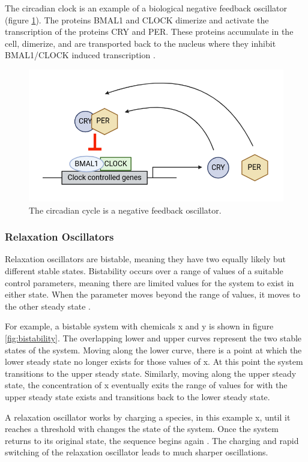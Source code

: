 \documentclass[12pt]{report}
\begin{document}
The circadian clock is an example of a biological negative feedback oscillator (figure \ref{fig:circadian}). The proteins BMAL1 and CLOCK dimerize and activate the transcription of the proteins CRY and PER. These proteins accumulate in the cell, dimerize, and are transported back to the nucleus where they inhibit BMAL1/CLOCK induced transcription \cite{Rossetti2012}.

\begin{figure}
    \centering
    \includegraphics[width=12cm]{images/circadian.png}
    \caption[Negative feedback oscillation of the circadian cycle]{The circadian cycle is a negative feedback oscillator.}
    \label{fig:circadian}
\end{figure}

\subsubsection{Relaxation Oscillators}
Relaxation oscillators are bistable, meaning they have two equally likely but different stable states. Bistability occurs over a range of values of a suitable control parameters, meaning there are limited values for the system to exist in either state. When the parameter moves beyond the range of values, it moves to the other steady state \cite{Sharma2006}.

For example, a bistable system with chemicals x and y is shown in figure \ref{fig:bistability}. The overlapping lower and upper curves represent the two stable states of the system. Moving along the lower curve, there is a point at which the lower steady state no longer exists for those values of x. At this point the system transitions to the upper steady state. Similarly, moving along the upper steady state, the concentration of x eventually exits the range of values for with the upper steady state exists and transitions back to the lower steady state.

A relaxation oscillator works by charging a species, in this example x, until it reaches a threshold with changes the state of the system. Once the system returns to its original state, the sequence begins again \cite{sauro_network_2009}. The charging and rapid switching of the relaxation oscillator leads to much sharper oscillations.
\end{document}
